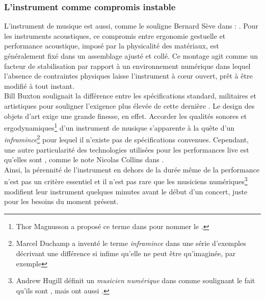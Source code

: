 	
\subsubsection{L'instrument comme compromis instable}

\noindent L'instrument de musique est aussi, comme le souligne Bernard Sève dans \cite{seve_instrument_2013} : . Pour les instruments acoustiques, ce compromis entre ergonomie gestuelle et performance acoustique, imposé par la physicalité des matériaux, est généralement fixé dans un assemblage ajusté et collé. Ce montage agit comme un facteur de stabilisation par rapport à un environnement numérique dans lequel l'absence de contraintes physiques laisse l'instrument à cœur ouvert, prêt à être modifié à tout instant.\\
\indent Bill Buxton soulignait la différence entre les spécifications standard, militaires et artistiques pour souligner l'exigence plus élevée de cette dernière \cite{buxton_artists_1997}. Le design des objets d'art exige une grande finesse, en effet. Accorder les qualités sonores et ergodynamiques\footnote{Thor Magnusson a proposé ce terme dans \cite{magnusson_ergodynamics_2019} pour nommer le .} d'un instrument de musique s'apparente à la quête d'un \textit{inframince}\footnote{\label{fn:inframince}Marcel Duchamp \cite{duchamp_notes_2008} a inventé le terme \textit{inframince} dans une série d'exemples décrivant une différence si infime qu'elle ne peut être qu'imaginée, par exemple } pour lequel il n'existe pas de spécifications convenues. Cependant, une autre particularité des technologies utilisées pour les performances live est qu'elles sont , comme le note Nicolas Collins dans \cite{collins_semiconducting_2013}.\\
\indent Ainsi, la pérennité de l'instrument en dehors de la durée même de la performance n'est pas un critère essentiel et il n'est pas rare que les musiciens numériques\footnote{Andrew Hugill définit un \textit{musicien numérique} dans \cite{hugill_digital_2008} comme  soulignant le fait qu'ils sont , mais ont aussi .} modifient leur instrument quelques minutes avant le début d'un concert, juste pour les besoins du moment présent.

